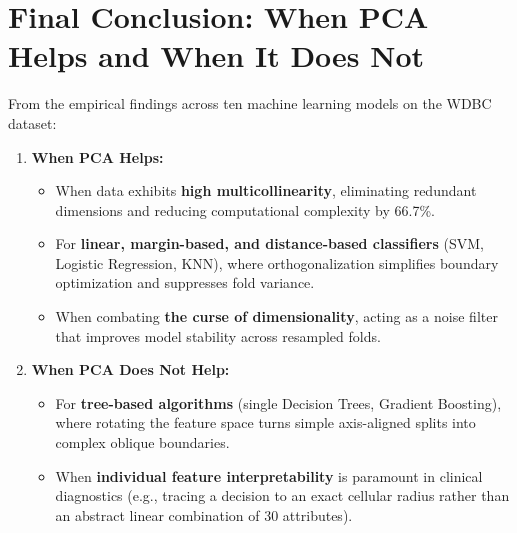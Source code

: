 \documentclass[12pt,a4paper]{article}
\begin{document}
\section{Final Conclusion: When PCA Helps and When It Does Not}
From the empirical findings across ten machine learning models on the WDBC dataset:
\begin{enumerate}
\item \textbf{When PCA Helps:}
\begin{itemize}
\item When data exhibits \textbf{high multicollinearity}, eliminating redundant dimensions and reducing computational complexity by 66.7\%.
\item For \textbf{linear, margin-based, and distance-based classifiers} (SVM, Logistic Regression, KNN), where orthogonalization simplifies boundary optimization and suppresses fold variance.
\item When combating \textbf{the curse of dimensionality}, acting as a noise filter that improves model stability across resampled folds.
\end{itemize}
\item \textbf{When PCA Does Not Help:}
\begin{itemize}
\item For \textbf{tree-based algorithms} (single Decision Trees, Gradient Boosting), where rotating the feature space turns simple axis-aligned splits into complex oblique boundaries.
\item When \textbf{individual feature interpretability} is paramount in clinical diagnostics (e.g., tracing a decision to an exact cellular radius rather than an abstract linear combination of 30 attributes).
\end{itemize}
\end{enumerate}
\end{document}
